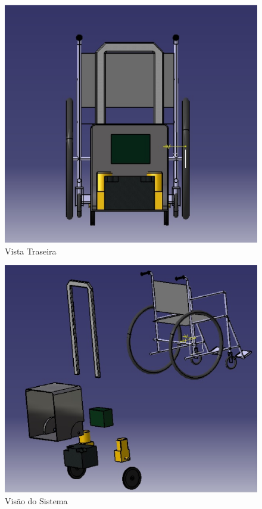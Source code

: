 \begin{figure}[!htb]
\centering
\includegraphics[keepaspectratio=true,scale=0.4]{figuras/estrutura/vista_traseira}
\caption{Vista Traseira}
\label{fig:traseira}
\end{figure}

\begin{figure}[!htb]
\centering
\includegraphics[keepaspectratio=true,scale=0.4]{figuras/estrutura/explode}
\caption{Visão do Sistema}
\label{fig:sistema}
\end{figure}

